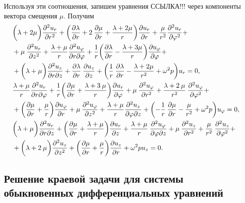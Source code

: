 Используя эти соотношения, запишем уравнения ССЫЛКА!!! через компоненты вектора смещения $\mu.$ Получим
\begin{equation}
\begin{aligned}
&\biggl(\lambda+2\mu\biggr)\frac{\partial^2u_r}{\partial r^2}+\biggl(\frac{\partial\lambda}{\partial r}+2\:\frac{\partial\mu}{\partial r}+\frac{\lambda+2\mu}{r}\biggr)\frac{\partial u_r}{\partial r}+\frac{\mu}{r^2}\frac{\partial^2 u_r}{\partial \varphi^2}+\\
&+\mu\:\frac{\partial^2 u_r}{\partial z^2}+\frac{\lambda+\mu}{r}\frac{\partial^2 u_{\varphi}}{\partial r\partial\varphi}+\frac{1}{r}\biggl(\frac{\partial\lambda}{\partial r}-\frac{\lambda+3\mu}{r}\biggr)\frac{\partial u_{\varphi}}{\partial\varphi}+\\
&+\biggl(\lambda+\mu\biggr)\frac{\partial^2 u_z}{\partial r\partial z}+\frac{\partial\lambda}{\partial r}\:\frac{\partial u_z}{\partial z}+\biggl(\frac{1}{r}\:\frac{\partial\lambda}{\partial r}-\frac{\lambda+2\mu}{r^2}+\omega^2 p\biggr)u_r=0,\\
&\frac{\lambda+\mu}{r}\frac{\partial^2u_r}{\partial r\partial\varphi}+\frac{1}{r}\biggl(\frac{\partial\mu}{\partial r}+\frac{\lambda+3\:\mu}{r}\biggr)\frac{\partial u_r}{\partial\varphi}+\mu\:\frac{\partial^2 u_{\varphi}}{\partial r^2}+\frac{\lambda+2\:\mu}{r^2}\:\frac{\partial^2 u_{\varphi}}{\partial \varphi^2}+\\
&+\biggl(\frac{\partial\mu}{\partial r}+\frac{\mu}{r}\biggr)\frac{\partial u_{\varphi}}{\partial r}+\mu\:\frac{\partial^2 u_{\varphi}}{\partial z^2}+\frac{\lambda+\mu}{r}\frac{\partial^2 u_z}{\partial \varphi\partial z}+\biggl(-\frac{1}{r}\:\frac{\partial\mu}{\partial r}-\frac{\mu}{r^2}+\omega^2 p\biggr)u_{\varphi}=0,\\
&\biggl(\lambda+\mu\biggr)\frac{\partial^2u_r}{\partial r\partial z}+\biggl(\frac{\partial\mu}{\partial r}+\frac{\lambda+\mu}{r}\biggr)\frac{\partial u_r}{\partial z}+\frac{\lambda+\mu}{r}\:\frac{\partial^2 u_{\varphi}}{\partial \varphi\partial z}+\mu\:\frac{\partial^2 u_z}{\partial r^2}+\frac{\mu}{r^2}\:\frac{\partial^2 u_z}{\partial {\varphi}^2}+\\
&+\biggl(\lambda+2\:\mu\biggr)\frac{\partial^2 u_z}{\partial z^2}+\biggl(\frac{\partial\mu}{\partial r}+\frac{\mu}{r}\biggr)\frac{\partial u_z}{\partial r}+\omega^2 pu_z=0.
\end{aligned}
\end{equation}
\newpage
\subsection{Решение краевой задачи для системы обыкновенных дифференциальных уравнений}

